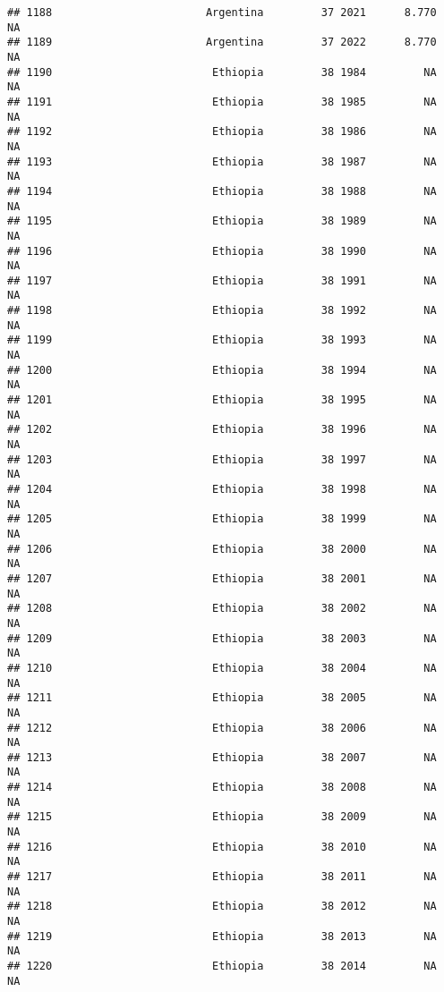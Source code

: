 \documentclass[
]{article}
\begin{document}
\begin{verbatim}
## 1188                        Argentina         37 2021      8.770         NA
## 1189                        Argentina         37 2022      8.770         NA
## 1190                         Ethiopia         38 1984         NA         NA
## 1191                         Ethiopia         38 1985         NA         NA
## 1192                         Ethiopia         38 1986         NA         NA
## 1193                         Ethiopia         38 1987         NA         NA
## 1194                         Ethiopia         38 1988         NA         NA
## 1195                         Ethiopia         38 1989         NA         NA
## 1196                         Ethiopia         38 1990         NA         NA
## 1197                         Ethiopia         38 1991         NA         NA
## 1198                         Ethiopia         38 1992         NA         NA
## 1199                         Ethiopia         38 1993         NA         NA
## 1200                         Ethiopia         38 1994         NA         NA
## 1201                         Ethiopia         38 1995         NA         NA
## 1202                         Ethiopia         38 1996         NA         NA
## 1203                         Ethiopia         38 1997         NA         NA
## 1204                         Ethiopia         38 1998         NA         NA
## 1205                         Ethiopia         38 1999         NA         NA
## 1206                         Ethiopia         38 2000         NA         NA
## 1207                         Ethiopia         38 2001         NA         NA
## 1208                         Ethiopia         38 2002         NA         NA
## 1209                         Ethiopia         38 2003         NA         NA
## 1210                         Ethiopia         38 2004         NA         NA
## 1211                         Ethiopia         38 2005         NA         NA
## 1212                         Ethiopia         38 2006         NA         NA
## 1213                         Ethiopia         38 2007         NA         NA
## 1214                         Ethiopia         38 2008         NA         NA
## 1215                         Ethiopia         38 2009         NA         NA
## 1216                         Ethiopia         38 2010         NA         NA
## 1217                         Ethiopia         38 2011         NA         NA
## 1218                         Ethiopia         38 2012         NA         NA
## 1219                         Ethiopia         38 2013         NA         NA
## 1220                         Ethiopia         38 2014         NA         NA

\end{verbatim}
\end{document}
